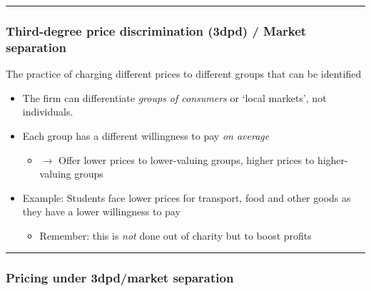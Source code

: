 \documentclass[]{article}
\providecommand{\tightlist}{%
  \setlength{\itemsep}{0pt}\setlength{\parskip}{0pt}}
\begin{document}
\begin{center}\rule{0.5\linewidth}{\linethickness}\end{center}

\hypertarget{third-degree-price-discrimination-3dpd-market-separation}{%
\subsubsection{Third-degree price discrimination (3dpd) / Market separation}\label{third-degree-price-discrimination-3dpd-market-separation}}

\begin{description}
\tightlist
\item[Third-degree price discrimination/Market-separation]
The practice of charging different prices to different groups that can be identified
\end{description}

\begin{itemize}
\tightlist
\item
  The firm can differentiate \emph{groups of consumers} or `local markets', not individuals.
\item
  Each group has a different willingness to pay \emph{on average}

  \begin{itemize}
  \tightlist
  \item
    \(\rightarrow\) Offer lower prices to lower-valuing groups, higher prices to higher-valuing groups
  \end{itemize}
\end{itemize}

\begin{itemize}
\tightlist
\item
  Example: Students face lower prices for transport, food and other goods as they have a lower willingness to pay

  \begin{itemize}
  \tightlist
  \item
    Remember: this is \emph{not} done out of charity but to boost profits
  \end{itemize}
\end{itemize}

\begin{center}\rule{0.5\linewidth}{\linethickness}\end{center}

\hypertarget{pricing-under-3dpdmarket-separation}{%
\subsubsection{Pricing under 3dpd/market separation}\label{pricing-under-3dpdmarket-separation}}
\end{document}
